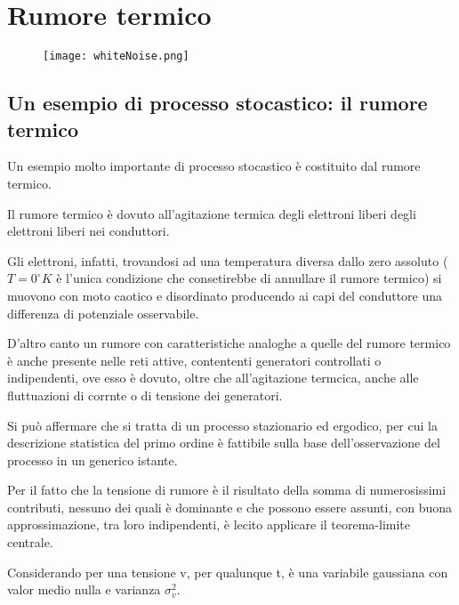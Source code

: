 \chapter{Rumore termico}

\begin{figure}[h]
    \centering
    \texttt{[image: whiteNoise.png]} 
\end{figure}  

\newpage

\section{Un esempio di processo stocastico: il rumore termico}

Un esempio molto importante di processo stocastico è costituito dal rumore termico. \newline 

Il rumore termico è dovuto all'agitazione termica degli elettroni liberi degli elettroni liberi nei conduttori. \newline 

Gli elettroni, infatti, trovandosi ad una temperatura diversa dallo zero assoluto 
($T = 0^{\circ} K$ è l'unica condizione che consetirebbe di annullare il rumore termico) 
si muovono con moto caotico e disordinato producendo ai capi del conduttore una differenza di potenziale osservabile. \newline 

D'altro canto un rumore con caratteristiche analoghe a quelle del rumore termico è anche presente 
nelle reti attive, contententi generatori controllati o indipendenti, ove esso è dovuto, oltre che 
all'agitazione termcica, anche alle fluttuazioni di corrnte o di tensione dei generatori. \newline 


Si può affermare che si tratta di un processo stazionario ed ergodico, per cui la descrizione statistica del primo ordine 
è fattibile sulla base dell'osservazione del processo in un generico istante. \newline 

Per il fatto che la tensione di rumore è il risultato della somma di numerosissimi contributi, nessuno dei quali è dominante 
e che possono essere assunti, con buona approssimazione, tra loro indipendenti, è lecito applicare il teorema-limite centrale. \newline 

Considerando per una tensione v, per qualunque t, è una variabile gaussiana con valor medio nulla e varianza $\sigma_v ^{2}$. \newline 


